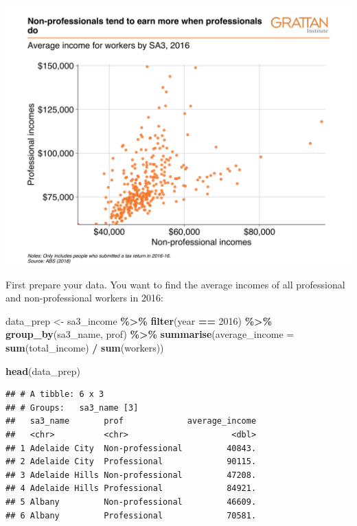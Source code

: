 \documentclass[
]{book}
\newenvironment{Shaded}{\begin{snugshade}}{\end{snugshade}}
\newcommand{\DataTypeTok}[1]{\textcolor[rgb]{0.13,0.29,0.53}{#1}}
\newcommand{\DecValTok}[1]{\textcolor[rgb]{0.00,0.00,0.81}{#1}}
\newcommand{\KeywordTok}[1]{\textcolor[rgb]{0.13,0.29,0.53}{\textbf{#1}}}
\newcommand{\NormalTok}[1]{#1}
\newcommand{\OperatorTok}[1]{\textcolor[rgb]{0.81,0.36,0.00}{\textbf{#1}}}
\newcommand{\StringTok}[1]{\textcolor[rgb]{0.31,0.60,0.02}{#1}}
\begin{document}
\includegraphics[width=44.44in]{atlas/scatter_reshape}

First prepare your data. You want to find the average incomes of all professional and non-professional workers in 2016:

\begin{Shaded}
\begin{Highlighting}[]
\NormalTok{data\_prep \textless{}{-}}\StringTok{ }\NormalTok{sa3\_income }\OperatorTok{\%\textgreater{}\%}\StringTok{ }
\StringTok{  }\KeywordTok{filter}\NormalTok{(year }\OperatorTok{==}\StringTok{ }\DecValTok{2016}\NormalTok{) }\OperatorTok{\%\textgreater{}\%}\StringTok{ }
\StringTok{  }\KeywordTok{group\_by}\NormalTok{(sa3\_name, prof) }\OperatorTok{\%\textgreater{}\%}\StringTok{ }
\StringTok{  }\KeywordTok{summarise}\NormalTok{(}\DataTypeTok{average\_income =} \KeywordTok{sum}\NormalTok{(total\_income) }\OperatorTok{/}\StringTok{ }\KeywordTok{sum}\NormalTok{(workers))}

\KeywordTok{head}\NormalTok{(data\_prep)}
\end{Highlighting}
\end{Shaded}

\begin{verbatim}
## # A tibble: 6 x 3
## # Groups:   sa3_name [3]
##   sa3_name       prof             average_income
##   <chr>          <chr>                     <dbl>
## 1 Adelaide City  Non-professional         40843.
## 2 Adelaide City  Professional             90115.
## 3 Adelaide Hills Non-professional         47208.
## 4 Adelaide Hills Professional             84921.
## 5 Albany         Non-professional         46609.
## 6 Albany         Professional             70581.
\end{verbatim}
\end{document}
